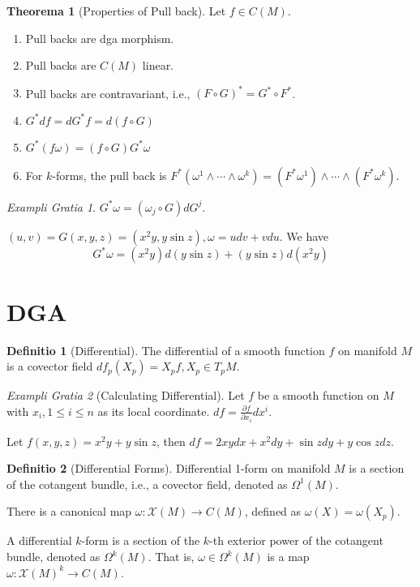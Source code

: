 \documentclass[12pt, a4paper]{article}
\theoremstyle{definition}
\newtheorem{theorem}{Theorema}[section]
\newtheorem{definition}{Definitio}[section]
\theoremstyle{remark}
\newtheorem{example}{Exampli Gratia}[section]
\begin{document}
\begin{theorem}[Properties of Pull back]
	Let $f \in C(M)$. 
	\begin{enumerate}
		\item Pull backs are dga morphism. 
		\item Pull backs are $C(M)$ linear.
		\item Pull backs are contravariant, i.e., $(F \circ G)^* = G^* \circ F^*$.
		\item $G^*df = dG^*f =d(f \circ G)$
		\item $G^*(f \omega) = (f \circ G)G^*\omega$
		\item For $k$-forms, the pull back is $F^*(\omega^1 \wedge \cdots \wedge \omega^k) = (F^*\omega^1)\wedge \cdots \wedge (F^*\omega^k)$.
	\end{enumerate}
\end{theorem}

\begin{example}
	$G^*\omega = (\omega_j \circ G)dG^j$. 

	$(u,v) = G(x,y,z) = (x^2y, y\sin{z}), \omega = udv + vdu$. 
	We have 
	$$
	G^*\omega = (x^2y)d(y\sin{z}) + (y\sin{z})d(x^2y) 
	$$

\end{example}


\section{DGA}

\begin{definition}[Differential]
	The differential of a smooth function $f$ on manifold $M$ is a covector field $df_p(X_p) = X_pf, X_p \in T_pM$.
\end{definition}

\begin{example}[Calculating Differential]
	Let $f$ be a smooth function on $M$ with $x_i, 1\leq i \leq n$ as its local coordinate. 
	$df = \frac{\partial f}{\partial x_i}dx^i$.

	Let $f(x,y,z) = x^2y + y\sin{z}$, then $df = 2xydx + x^2dy + \sin{z}dy + y\cos{z}dz$.
\end{example}

\begin{definition}[Differential Forms]
	Differential 1-form on manifold $M$ is a section of the cotangent bundle, i.e., a covector field, denoted as $\Omega^1(M)$.
	
	There is a canonical map $\omega: \mathscr{X}(M) \rightarrow  C(M)$, defined as $\omega(X) = \omega(X_p)$.

	A differential $k$-form is a section of the $k$-th exterior power of the cotangent bundle, denoted as $\Omega^k(M)$.
	That is, $\omega \in \Omega^k(M)$ is a map $\omega: \mathscr{X}(M)^k \rightarrow C(M)$.
\end{definition}
\end{document}
